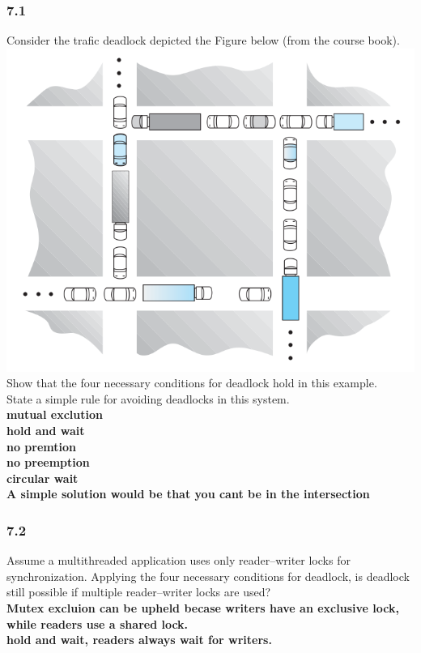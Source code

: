 \documentclass[a4paper,10pt,titlepage]{report}
\begin{document}
\subsubsection{7.1} Consider the trafic deadlock depicted the Figure below (from the course book). 
\\
\includegraphics[scale=0.5]{ex-7_1.png}
\\
Show that the four necessary conditions for deadlock hold in this example.\\
State a simple rule for avoiding deadlocks in this system.\\
\textbf{mutual exclution \\
hold and wait\\
no premtion \\
no preemption \\
circular wait \\}
\vspace{10mm}
\textbf{A simple solution would be that you cant be in the intersection}

\subsubsection{7.2} 
Assume a multithreaded application uses only reader–writer locks for synchronization. Applying the four necessary conditions for deadlock, is deadlock still possible if multiple reader–writer locks are used?
\\
\textbf{Mutex excluion can be upheld becase writers have an exclusive lock, while readers use a shared lock.}
\\
\textbf{hold and wait, readers always wait for writers.}
\end{document}
